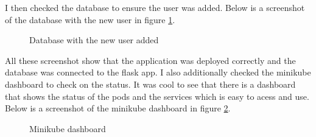 \documentclass[12pt]{Article}
\begin{document}
I then checked the database to ensure the user was added.
Below is a screenshot of the database with the new user in figure \ref{fig:db}.

\begin{figure}[H]
    \centering
    \caption{Database with the new user added}
    \label{fig:db}
\end{figure}

All these screenshot show that the application was deployed correctly and the database was connected to the flask app.
I also additionally checked the minikube dashboard to check on the status.
It was cool to see that there is a dashboard that shows the status of the pods and the services which is easy to acess and use.
Below is a screenshot of the minikube dashboard in figure \ref{fig:dashboard}.

\begin{figure}[H]
    \centering
    \caption{Minikube dashboard}
    \label{fig:dashboard}
\end{figure}

\clearpage
\end{document}
